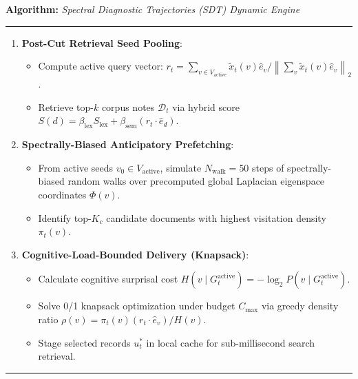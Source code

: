 \documentclass[11pt]{article}
\newcommand{\norm}[1]{\left\lVert#1\right\rVert}
\newenvironment{pseudocode}[1]{%
  \begin{list}{}{\setlength{\leftmargin}{1em}\setlength{\itemsep}{1pt}}
  \item \textbf{Algorithm:} \textit{#1}
  \item \hrule \medskip
}{%
  \vspace{4pt}\hrule
  \end{list}
}
\begin{document}
\begin{pseudocode}{Spectral Diagnostic Trajectories (SDT) Dynamic Engine}
\begin{enumerate}
  \begin{itemize}
    \item \textbf{if} $\Delta \lambda_2(t) > \tau_{\text{pivot}}$ \textbf{then}
    \item \quad Apply polynomial Chebyshev high-pass filter $\tilde{x}_t = H(L_t) x_t$.
    \item \quad Partition vertices: $V_{\text{stale}} \leftarrow \{u \in V_t \mid v_2(u) < 0\}$; $V_{\text{active}} \leftarrow \{v \in V_t \mid v_2(v) \ge 0\}$.
    \item \quad Sever boundary hyperedges; isolate active subgraph $G_t^{\text{active}}$.
    \item \textbf{else}
    \item \quad Set $V_{\text{active}} \leftarrow V_t$; maintain continuous active state.
    \item \textbf{end if}
  \end{itemize}
  \item \textbf{Post-Cut Retrieval Seed Pooling}:
  \begin{itemize}
    \item Compute active query vector: $r_t = \sum_{v \in V_{\text{active}}} \tilde{x}_t(v) \hat{e}_v / \norm{\sum_{v} \tilde{x}_t(v) \hat{e}_v}_2$.
    \item Retrieve top-$k$ corpus notes $\mathcal{D}_t$ via hybrid score $S(d) = \beta_{\text{lex}} S_{\text{lex}} + \beta_{\text{sem}} (r_t \cdot \hat{e}_d)$.
  \end{itemize}
  \item \textbf{Spectrally-Biased Anticipatory Prefetching}:
  \begin{itemize}
    \item From active seeds $v_0 \in V_{\text{active}}$, simulate $N_{\text{walk}} = 50$ steps of spectrally-biased random walks over precomputed global Laplacian eigenspace coordinates $\Phi(v)$.
    \item Identify top-$K_c$ candidate documents with highest visitation density $\pi_t(v)$.
  \end{itemize}
  \item \textbf{Cognitive-Load-Bounded Delivery (Knapsack)}:
  \begin{itemize}
    \item Calculate cognitive surprisal cost $H(v \mid G_t^{\text{active}}) = -\log_2 P(v \mid G_t^{\text{active}})$.
    \item Solve 0/1 knapsack optimization under budget $C_{\max}$ via greedy density ratio $\rho(v) = \pi_t(v) (r_t \cdot \hat{e}_v) / H(v)$.
    \item Stage selected records $u_t^*$ in local cache for sub-millisecond search retrieval.
  \end{itemize}
\end{enumerate}
\end{pseudocode}
\end{document}
